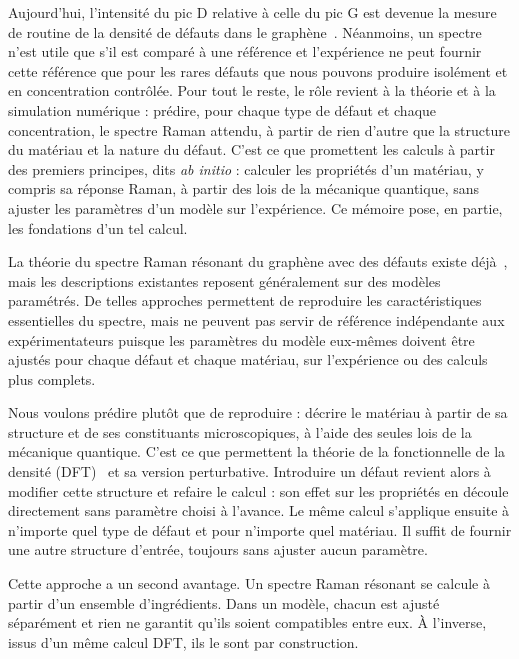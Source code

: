 Aujourd'hui, l'intensité du pic D relative à celle du pic G est devenue la mesure de routine de la densité de défauts dans le graphène~\cite{luccheseQuantifyingIoninducedDefects2010,martinsferreiraEvolutionRamanSpectra2010}. Néanmoins, un spectre n'est utile que s'il est comparé à une référence et l'expérience ne peut fournir cette référence que pour les rares défauts que nous pouvons produire isolément et en concentration contrôlée. Pour tout le reste, le rôle revient à la théorie et à la simulation numérique : prédire, pour chaque type de défaut et chaque concentration, le spectre Raman attendu, à partir de rien d'autre que la structure du matériau et la nature du défaut. C'est ce que promettent les calculs à partir des premiers principes, dits \textit{ab initio} : calculer les propriétés d'un matériau, y compris sa réponse Raman, à partir des lois de la mécanique quantique, sans ajuster les paramètres d'un modèle sur l'expérience. Ce mémoire pose, en partie, les fondations d'un tel calcul.


La théorie du spectre Raman résonant du graphène avec des défauts existe déjà~\cite{venezuelaTheoryDoubleresonantRaman2011}, mais les descriptions existantes reposent généralement sur des modèles paramétrés. De telles approches permettent de reproduire les caractéristiques essentielles du spectre, mais ne peuvent pas servir de référence indépendante aux expérimentateurs puisque les paramètres du modèle eux-mêmes doivent être ajustés pour chaque défaut et chaque matériau, sur l'expérience ou des calculs plus complets.

Nous voulons prédire plutôt que de reproduire : décrire le matériau à partir de sa structure et de ses constituants microscopiques, à l'aide des seules lois de la mécanique quantique. C'est ce que permettent la théorie de la fonctionnelle de la densité (DFT)~\cite{hohenbergInhomogeneousElectronGas1964,kohnSelfConsistentEquationsIncluding1965} et sa version perturbative. Introduire un défaut revient alors à modifier cette structure et refaire le calcul : son effet sur les propriétés en découle directement sans paramètre choisi à l'avance. Le même calcul s'applique ensuite à n'importe quel type de défaut et pour n'importe quel matériau. Il suffit de fournir une autre structure d'entrée, toujours sans ajuster aucun paramètre.

Cette approche a un second avantage. Un spectre Raman résonant se calcule à partir d'un ensemble d'ingrédients. Dans un modèle, chacun est ajusté séparément et rien ne garantit qu'ils soient compatibles entre eux. À l'inverse, issus d'un même calcul DFT, ils le sont par construction.

